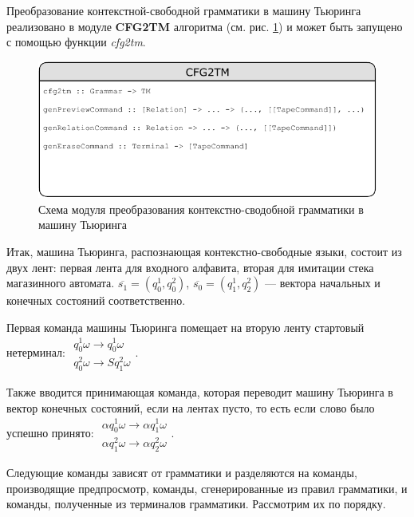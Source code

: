 \documentclass[14pt]{matmex-diploma-custom}
\begin{document}
Преобразование контекстной-свободной грамматики в машину Тьюринга реализовано в модуле \textbf{CFG2TM} алгоритма (см. рис. \ref{fig:cfg2tm}) и может быть запущено с помощью функции \textit{cfg2tm}. 

\begin{figure}[H]
\centering
  \includegraphics[width=\linewidth]{pics/cfg2tm.pdf}
  \caption{Схема модуля преобразования контекстно-сводобной грамматики в машину Тьюринга}
  \label{fig:cfg2tm}
\end{figure}

Итак, машина Тьюринга, распознающая контекстно-свободные языки, состоит из двух лент: первая
лента для входного алфавита, вторая для имитации стека магазинного автомата. 
$\overline{s_1} = (q_0^1, q_0^2)$, $\overline{s_0} = (q_1^1, q_2^2)$ --- вектора начальных и конечных
состояний соответственно. 

Первая команда машины Тьюринга помещает на вторую ленту стартовый нетерминал:
$\begin{array}{lcl}
    q_0^1 \omega \to q_0^1 \omega \\
    q_0^2 \omega \to S q_1^2 \omega 
\end{array}$.

Также вводится принимающая команда, которая переводит машину Тьюринга в вектор конечных состояний, если на лентах пусто, то есть если слово было успешно принято:
$\begin{array}{lcl}
    \alpha q_0^1 \omega \to \alpha q_1^1 \omega \\
    \alpha q_1^2 \omega \to \alpha q_2^2 \omega 
\end{array}$.

Следующие команды зависят от грамматики и разделяются на команды, производящие предпросмотр, команды, сгенерированные из правил грамматики, 
и команды, полученные из терминалов грамматики. Рассмотрим их по порядку.
\end{document}
